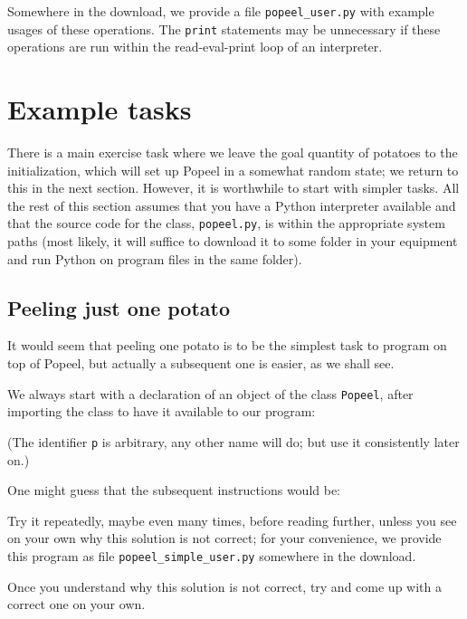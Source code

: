 \documentclass[12pt]{article}
\begin{document}
Somewhere in the download, we provide a file 
{\tt popeel_user.py} with example usages of these operations.
The {\tt print} statements may be unnecessary if these
operations are run within the read-eval-print loop of
an interpreter.

\section{Example tasks}

There is a main exercise task where we leave the
goal quantity of potatoes to the initialization,
which will set up Popeel in a somewhat random state;
we return to this in the next section. However, it
is worthwhile to start with simpler tasks. All
the rest of this section assumes that you have
a Python interpreter available and that the
source code for the class, {\tt popeel.py}, is within
the appropriate system paths (most likely, it will
suffice to download it to some folder in your 
equipment and run Python on program files in
the same folder).

\subsection{Peeling just one potato}

It would seem that peeling one potato is to be
the simplest task to program on top of Popeel,
but actually a subsequent one is easier, as we
shall see.

We always start with a declaration of an object
of the class {\tt Popeel}, after importing the class
to have it available to our program:



(The identifier {\tt p} is arbitrary, any other
name will do; but use it consistently later on.)

One might guess that the subsequent instructions
would be:



Try it repeatedly, maybe even many times, 
before reading further, unless you see
on your own why this solution is not correct; 
for your convenience, we provide this program as file 
{\tt popeel_simple_user.py} somewhere in the download.

Once you understand why this solution is not
correct, try and come up with a correct one
on your own. 
\end{document}
